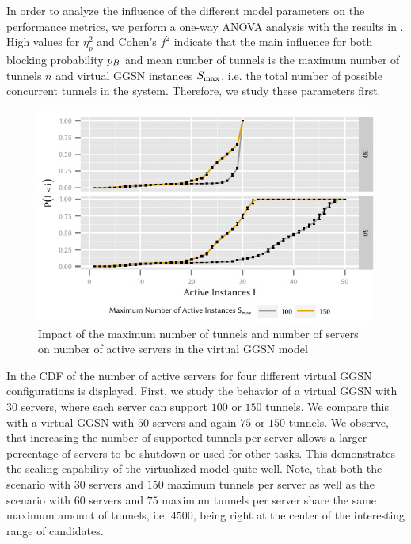 In order to analyze the influence of the different model parameters on the performance metrics, we perform a one-way ANOVA analysis with the results in .
High values for \(\eta_p^2\) and Cohen's \(f^2\)\cite{Ellis2010} indicate that the main influence for both blocking probability \(p_B\) and mean number of tunnels is the maximum number of tunnels \(n\) and virtual \gls{GGSN} instances \(S_{\max}\), i.e. the total number of possible concurrent tunnels in the system.
Therefore, we study these parameters first.

\begin{figure}
  \centering
  \includegraphics{cloud/virtualized_network_functions/performance_evaluation/figures/instanceuse_multiserver}
  \caption{Impact of the maximum number of tunnels and number of servers on number of active servers in the virtual \gls{GGSN} model}
  \label{fig:cloud:virtualized_network_functions:performance_evaluation:virtual_ggsn:instanceuse_multiserver}
\end{figure}

In  the \gls{CDF} of the number of active servers for four different virtual \gls{GGSN} configurations is displayed.
First, we study the behavior of a virtual \gls{GGSN} with \(30\) servers, where each server can support \(100\) or \(150\) tunnels.  
We compare this with a virtual \gls{GGSN} with \(50\) servers and again \(75\) or \(150\) tunnels.
We observe, that increasing the number of supported tunnels per server allows a larger percentage of servers to be shutdown or used for other tasks. This demonstrates the scaling capability of the virtualized model quite well.
Note, that both the scenario with \(30\) servers and \(150\) maximum tunnels per server as well as the scenario with \(60\) servers and \(75\) maximum tunnels per server share the same maximum amount of tunnels, i.e. \(4500\), being right at the center of the interesting range of candidates.

